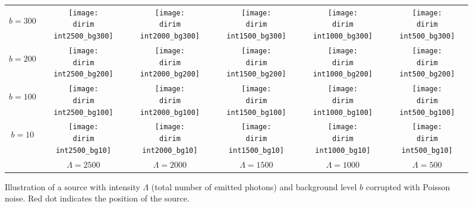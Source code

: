 \begin{figure}[!hbt]
	\centering
	\newcommand{\wf}{.15\textwidth}
	\newcommand{\dirim}{\qd gFREM/images/psf2/}
	\newcommand{\vs}{.4}
	\begin{tabular}{c|ccccc}
		\begin{sideways}\hspace{\vs cm}$b=300$\end{sideways}
		&\texttt{[image: \\dirim int2500\_bg300]}
		&\texttt{[image: \\dirim int2000\_bg300]}
		&\texttt{[image: \\dirim int1500\_bg300]}
		&\texttt{[image: \\dirim int1000\_bg300]}
		&\texttt{[image: \\dirim int500\_bg300]}\\
		\begin{sideways}\hspace{\vs cm}$b=200$\end{sideways}
		&\texttt{[image: \\dirim int2500\_bg200]}
		&\texttt{[image: \\dirim int2000\_bg200]}
		&\texttt{[image: \\dirim int1500\_bg200]}
		&\texttt{[image: \\dirim int1000\_bg200]}
		&\texttt{[image: \\dirim int500\_bg200]}\\
		\begin{sideways}\hspace{\vs cm}$b=100$\end{sideways}
		&\texttt{[image: \\dirim int2500\_bg100]}
		&\texttt{[image: \\dirim int2000\_bg100]}
		&\texttt{[image: \\dirim int1500\_bg100]}
		&\texttt{[image: \\dirim int1000\_bg100]}
		&\texttt{[image: \\dirim int500\_bg100]}\\
		\begin{sideways}\hspace{\vs cm}$b=10$\end{sideways}
		&\texttt{[image: \\dirim int2500\_bg10]}
		&\texttt{[image: \\dirim int2000\_bg10]}
		&\texttt{[image: \\dirim int1500\_bg10]}
		&\texttt{[image: \\dirim int1000\_bg10]}
		&\texttt{[image: \\dirim int500\_bg10]}\\
		\hline
		&$\Lambda=2500$ & $\Lambda=2000$ & $\Lambda=1500$ & $\Lambda=1000$ & $\Lambda=500$\\
	\end{tabular}
	\caption{Illustration of a source with intensity $\Lambda$ (total number of emitted photons) and background level $b$ corrupted with Poisson noise. Red dot indicates the position of the source.}
	\label{fig:PSF int bg}
\end{figure}

